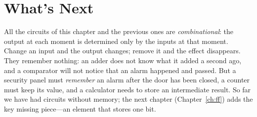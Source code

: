 \section{What's Next}

All the circuits of this chapter and the previous ones are \emph{combinational}:
the output at each moment is determined only by the inputs at that moment.
Change an input and the output changes; remove it and the effect disappears.
They remember nothing: an adder does not know what it added a second ago, and a
comparator will not notice that an alarm happened and passed. But a security
panel must \emph{remember} an alarm after the door has been closed, a counter
must keep its value, and a calculator needs to store an intermediate result. So
far we have had circuits without memory; the next chapter (Chapter~\ref{ch:ff})
adds the key missing piece---an element that stores one bit.
